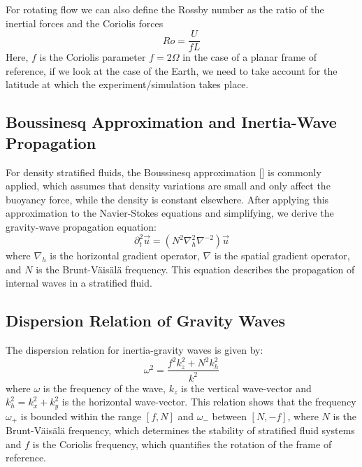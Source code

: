 \documentclass[final,5p,times,twocolumn,authoryear]{elsarticle}
\begin{document}
For rotating flow we can also define the Rossby number as the ratio of the inertial forces and the Coriolis forces
\begin{equation*}
	Ro = \frac{U}{fL}
\end{equation*}
Here, $f$ is the Coriolis parameter $f = 2\Omega$ in the case of a planar frame of reference, if we look at the case of the Earth, we need to take account for the latitude at which the experiment/simulation takes place.

\subsection{Boussinesq Approximation and Inertia-Wave Propagation}

For density stratified fluids, the Boussinesq approximation [\cite{boussinesq_theorie_1897}] is commonly applied, which assumes that density variations are small and only affect the buoyancy force, while the density is constant elsewhere. After applying this approximation to the Navier-Stokes equations and simplifying, we derive the gravity-wave propagation equation:
\begin{equation}
\partial^2_t \vec{u} = \left( N^2 \nabla^2_h \nabla^{-2} \right) \vec{u} \label{eq:Wave Propagation}
\end{equation}
where $\nabla_h$ is the horizontal gradient operator, $\nabla$ is the spatial gradient operator, and $N$ is the Brunt-Väisälä frequency. This equation describes the propagation of internal waves in a stratified fluid.

\subsection{Dispersion Relation of Gravity Waves}

The dispersion relation for inertia-gravity waves is given by:
\begin{equation}
\omega^2 = \frac{f^2 k_z^2 + N^2 k_h^2}{k^2} \label{eq:Dispersion relation}
\end{equation}
where $\omega$ is the frequency of the wave, $k_z$ is the vertical wave-vector and $k_h^2 = k_x^2 + k_y^2$ is the horizontal wave-vector. This relation shows that the frequency $\omega_+$ is bounded within the range $\left[ f, N \right]$ and $\omega_-$ between $\left[ N, -f \right]$, where $N$ is the Brunt-Väisälä frequency, which determines the stability of stratified fluid systems and $f$ is the Coriolis frequency, which quantifies the rotation of the frame of reference.
\end{document}
